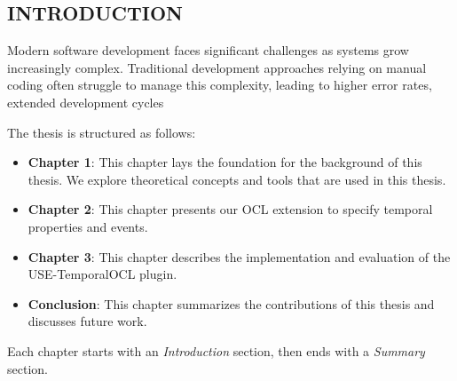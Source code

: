 \setcounter{page}{1}


\setlength{\parindent}{1cm}

\begin{center}
  \section*{INTRODUCTION}
\end{center}


\hspace{\parindent} Modern software development faces significant challenges as
systems grow increasingly complex. Traditional development approaches relying on 
manual coding often struggle to manage this complexity, leading to higher error
rates, extended development cycles

The thesis is structured as follows:
\begin{itemize}
  \item \textbf{Chapter 1}: This chapter lays the foundation for the background of this thesis.
  We explore theoretical concepts and tools that are used in this thesis.
  
  \item \textbf{Chapter 2}: This chapter presents our OCL extension to specify temporal properties and events.

  \item \textbf{Chapter 3}: This chapter describes the implementation and evaluation of the USE-TemporalOCL plugin. 

  \item \textbf{Conclusion}: This chapter summarizes the contributions of this thesis and discusses future work.
\end{itemize}

Each chapter starts with an \textit{Introduction} section, then ends with a \textit{Summary} section.


